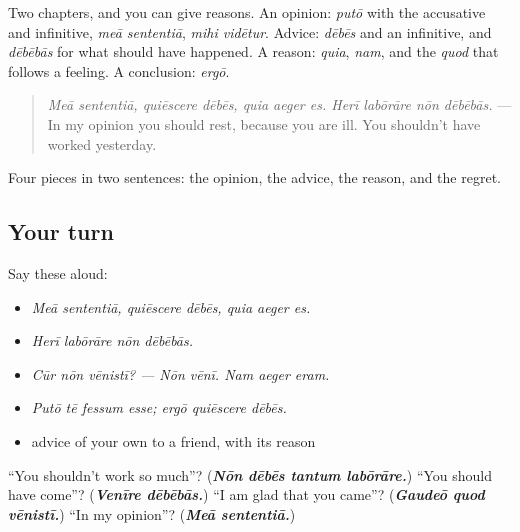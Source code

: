 \begin{grammarlens}[title={What you've built}]
Two chapters, and you can give reasons. An opinion: \emph{putō} with the accusative and infinitive, \emph{meā sententiā}, \emph{mihi vidētur}. Advice: \emph{dēbēs} and an infinitive, and \emph{dēbēbās} for what should have happened. A reason: \emph{quia}, \emph{nam}, and the \emph{quod} that follows a feeling. A conclusion: \emph{ergō}.

\begin{quote}
\emph{Meā sententiā, quiēscere dēbēs, quia aeger es. Herī labōrāre nōn dēbēbās.} — In my opinion you should rest, because you are ill. You shouldn't have worked yesterday.
\end{quote}

Four pieces in two sentences: the opinion, the advice, the reason, and the regret.
\end{grammarlens}

\subsection*{Your turn}
Say these aloud:

\begin{itemize}
\raggedright
  \item \emph{Meā sententiā, quiēscere dēbēs, quia aeger es.}
  \item \emph{Herī labōrāre nōn dēbēbās.}
  \item \emph{Cūr nōn vēnistī? — Nōn vēnī. Nam aeger eram.}
  \item \emph{Putō tē fessum esse; ergō quiēscere dēbēs.}
  \item advice of your own to a friend, with its reason
\end{itemize}

\begin{tcolorbox}[breakable,colback=teal!4,colframe=teal!35!black,title={Before you move on}]
\textquotedblleft{}You shouldn't work so much\textquotedblright{}? (\emph{\textbf{Nōn dēbēs tantum labōrāre.}}) \textquotedblleft{}You should have come\textquotedblright{}? (\emph{\textbf{Venīre dēbēbās.}}) \textquotedblleft{}I am glad that you came\textquotedblright{}? (\emph{\textbf{Gaudeō quod vēnistī.}}) \textquotedblleft{}In my opinion\textquotedblright{}? (\emph{\textbf{Meā sententiā.}})
\end{tcolorbox}
